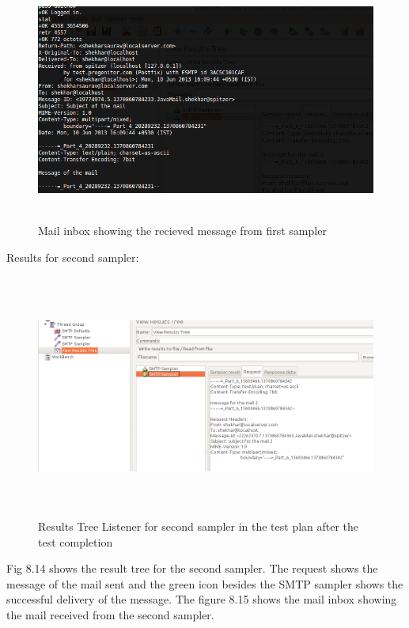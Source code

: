 \documentclass[12pt]{book}
\begin{document}
  \begin{figure}[H]
   \centering
   \includegraphics[width=15cm, height=8cm]{images/smtpdefaults_86}
   \caption{Mail inbox showing the recieved message from first sampler\label{fig:fig33_JMeter}}
  \end{figure}
  
  Results for second sampler:\\
  
  \begin{figure}[H]
   \centering
   \includegraphics[width=15cm, height=8cm]{images/smtpdefaults_87}
   \caption{Results Tree Listener for second sampler in the test plan after the test completion\label{fig:fig34_JMeter}}
  \end{figure}
  
  
  Fig 8.14 shows the result tree for the second sampler. The request shows the message of the mail
  sent and the green icon besides the SMTP sampler shows the successful delivery of the message.
  The figure 8.15 shows the mail inbox showing the mail received from the second sampler.
  
\end{document}
